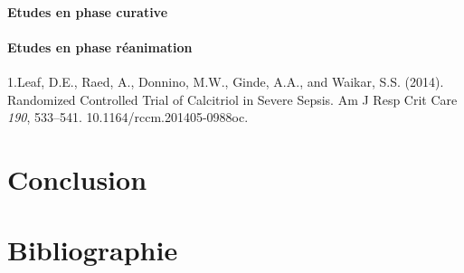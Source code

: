 \documentclass[
  a4paper,
  DIV=11,
  numbers=noendperiod,
  listof=totoc]{scrreprt}
\begin{document}
\subsubsection{Etudes en phase curative}\label{etudes-en-phase-curative}

\subsubsection{Etudes en phase
réanimation}\label{etudes-en-phase-ruxe9animation}

1.Leaf, D.E., Raed, A., Donnino, M.W., Ginde, A.A., and Waikar, S.S.
(2014). Randomized Controlled Trial of Calcitriol in Severe Sepsis. Am J
Resp Crit Care \emph{190}, 533--541. 10.1164/rccm.201405-0988oc.

\newpage{}

\chapter{Conclusion}\label{conclusion}

\newpage{}

\hypertarget{Bibliographie}{%
\chapter*{\centering Bibliographie}\label{Bibliographie}}
\singlespace

\printbibliography[heading=none]
\end{document}

